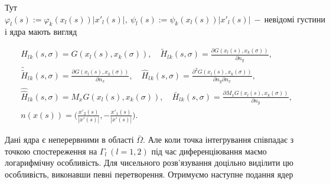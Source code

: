 \documentclass[12pt]{report}
\begin{document}
Тут $ \label{kernels} \varphi_l(s) :=\varphi_k(x_l(s))|x'_l(s)|, \ \psi_l(s) :=\psi_k(x_l(s))|x'_l(s)| \ - \ \textrm{невідомі густини} $ і ядра мають вигляд
 
 \begin{equation}
 \begin{split}
	&H_l{_k}(s, \sigma) = G(x_l(s),x_k(\sigma)), \quad \tilde{H}_l{_k}(s, \sigma)=\frac{\partial G(x_l(s),x_k(\sigma))}{\partial n_y}, \\
	&\tilde{\tilde{H}}_l{_k}(s, \sigma)=\frac{\partial G(x_l(s),x_k(\sigma))}{\partial n_x}, \quad \hat{H}_l{_k}(s, \sigma)=\frac{\partial^2 G(x_l(s),x_k(\sigma))}{\partial n_y\partial n_x}, \\
	&\hat{\hat{H}}_l{_k}(s, \sigma) = M_xG(x_l(s),x_k(\sigma)), \quad \bar{H}_l{_k}(s, \sigma)=\frac{\partial M_xG(x_l(s),x_k(\sigma))}{\partial n_y}, \\
	&n(x(s))=\Big(\frac{x'_2(s)}{|x'(s)|},-\frac{x'_1(s)}{|x'(s)|}\Big) \nonumber. 
 \end{split}
 \end{equation}
 
  Дані ядра є неперервними в області $\bar{\Omega}$. Але коли точка інтегрування співпадає з точкою спостереження на $\Gamma_l \ (l=1,2)$ під час диференціювання маємо логарифмічну особливість. Для чисельного розв'язування доцільно виділити цю особливість, виконавши певні перетворення. Отримуємо наступне подання ядер 
  
\end{document}
